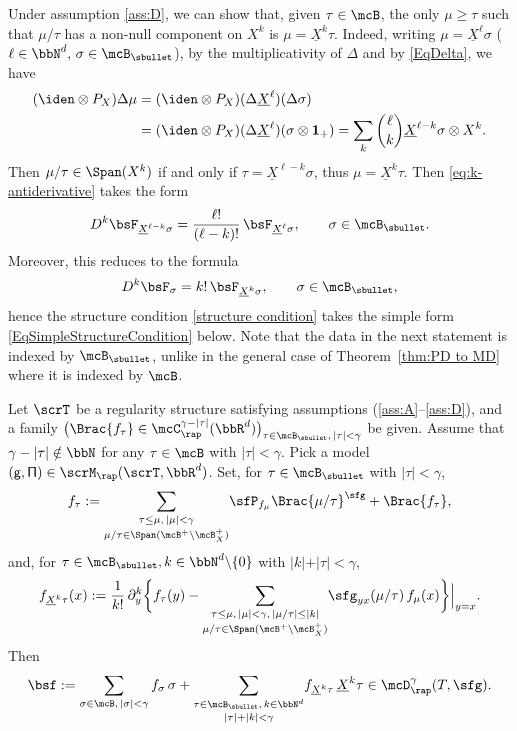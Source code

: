 Under assumption \eqref{ass:D}, we can show that, given $\tau\in\mcB$, the only $\mu\geq \tau$ such that $\mu/\tau$ has a non-null component on $X^k$ is $\mu=\underline{X}^k\tau$. Indeed, writing $\mu=\underline{X}^\ell\sigma$ ($\ell\in\bbN^d,\,\sigma\in\mcB_\sbullet$), by the multiplicativity of $\Delta$ and by \eqref{EqDelta}, we have
\begin{align*}
(\iden \otimes P_X)\Delta\mu
&=(\iden \otimes P_X)(\Delta\underline{X}^\ell)(\Delta\sigma)\\
&=(\iden \otimes P_X)(\Delta\underline{X}^\ell)(\sigma\otimes{\bf1}_+)
=\sum_{k}\binom{\ell}{k}\underline{X}^{\ell-k}\sigma\otimes X^{k}.
\end{align*}
Then $\mu/\tau\in\Span (X^k)$ if and only if $\tau=\underline{X}^{\ell-k}\sigma$, thus $\mu=\underline{X}^k\tau$.
Then \eqref{eq:k-antiderivative} takes the form
\[
D^k\bsF_{\underline{X}^{\ell-k}\sigma}=\frac{\ell!}{(\ell-k)!}\,\bsF_{\underline{X}^\ell\sigma},\qquad\sigma\in\mcB_\sbullet.
\]
Moreover, this reduces to the formula
\[
D^k\bsF_\sigma = k! \,\bsF_{\underline{X}^k\sigma},\qquad\sigma\in\mcB_\sbullet,
\]
hence the structure condition \eqref{structure condition} takes the simple form \eqref{EqSimpleStructureCondition} below. Note that the data in the next statement is indexed by $\mcB_\sbullet$, unlike in the general case of Theorem~\ref{thm:PD to MD} where it is indexed by $\mcB$.

\begin{cor} \label{thm:PD to MD2}
Let $\scrT$ be a regularity structure satisfying assumptions \textup{(\ref{ass:A}--\ref{ass:D})}, and a family $\bigl(\Brac{f_\tau}\in \mcC_\rap^{\gamma-|\tau|}(\bbR^d)\bigr)_{\tau\in\mcB_\sbullet,\,\vert\tau\vert<\gamma}$ be given. Assume that $\gamma-|\tau|\notin\bbN$ for any $\tau\in\mcB$ with $|\tau|<\gamma$. Pick a model ${\sf (g,\Pi)}\in\scrM_\rap(\scrT,\bbR^d)$. Set, for $\tau\in\mcB_\sbullet$ with $\vert\tau\vert<\gamma$,
\begin{align*}
f_\tau := \underset{\mu/\tau\in\Span (\mcB^+\setminus\mcB^+_X)}{\sum_{\tau\leq\mu, \,|\mu|<\gamma}} \sfP_{f_\mu}\Brac{\mu/\tau}^\sfg + \Brac{f_\tau},
\end{align*}
and, for $\tau\in\mcB_\sbullet, k\in\bbN^d\backslash\{0\}$ with $\vert k\vert+\vert\tau\vert<\gamma$,
\begin{equation} \label{EqSimpleStructureCondition}
f_{\underline{X}^k\tau}(x) :=
\frac1{k!}\,
\partial_y^k\bigg\{f_\tau(y) -
\underset{\mu/\tau\in\Span (\mcB^+\setminus\mcB^+_X)}{\sum_{\tau\leq\mu, \,|\mu|<\gamma,\, |\mu/\tau|\le|k|}}
\sfg_{yx}(\mu/\tau)\,f_\mu(x)\bigg\}\Big|_{y=x}.
\end{equation}
Then
\[
\bsf := \sum_{\sigma\in\mcB,\, \vert\sigma\vert<\gamma}f_\sigma\,\sigma + \underset{\vert\tau\vert+\vert k\vert<\gamma}{\sum_{\tau\in\mcB_\sbullet,\, k\in\bbN^d}} f_{\underline{X}^k\tau}\,\underline{X}^k\tau\in\mcD_\rap^{\gamma}(T, \sfg).
\]
\end{cor}

